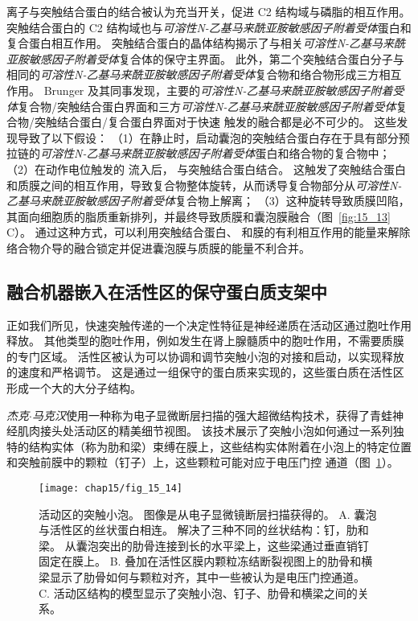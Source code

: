  离子与突触结合蛋白的结合被认为充当开关，促进 C2 结构域与磷脂的相互作用。
突触结合蛋白的 C2 结构域也与\textit{可溶性N-乙基马来酰亚胺敏感因子附着受体}蛋白和复合蛋白相互作用。
突触结合蛋白的晶体结构揭示了与相关\textit{可溶性N-乙基马来酰亚胺敏感因子附着受体}复合体的保守主界面。
此外，第二个突触结合蛋白分子与相同的\textit{可溶性N-乙基马来酰亚胺敏感因子附着受体}复合物和络合物形成三方相互作用。
Brunger 及其同事发现，主要的\textit{可溶性N-乙基马来酰亚胺敏感因子附着受体}复合物/突触结合蛋白界面和三方\textit{可溶性N-乙基马来酰亚胺敏感因子附着受体}复合物/突触结合蛋白/复合蛋白界面对于快速  触发的融合都是必不可少的。
这些发现导致了以下假设：
（1）在静止时，启动囊泡的突触结合蛋白存在于具有部分预拉链的\textit{可溶性N-乙基马来酰亚胺敏感因子附着受体}蛋白和络合物的复合物中；
（2）在动作电位触发的  流入后， 与突触结合蛋白结合。
这触发了突触结合蛋白和质膜之间的相互作用，导致复合物整体旋转，从而诱导复合物部分从\textit{可溶性N-乙基马来酰亚胺敏感因子附着受体}复合物上解离；
（3）这种旋转导致质膜凹陷，其面向细胞质的脂质重新排列，并最终导致质膜和囊泡膜融合（图~\ref{fig:15_13} C）。
通过这种方式，可以利用突触结合蛋白、 和膜的有利相互作用的能量来解除络合物介导的融合锁定并促进囊泡膜与质膜的能量不利合并。



\subsection{融合机器嵌入在活性区的保守蛋白质支架中}

正如我们所见，快速突触传递的一个决定性特征是神经递质在活动区通过胞吐作用释放。
其他类型的胞吐作用，例如发生在肾上腺髓质中的胞吐作用，不需要质膜的专门区域。
活性区被认为可以协调和调节突触小泡的对接和启动，以实现释放的速度和严格调节。
这是通过一组保守的蛋白质来实现的，这些蛋白质在活性区形成一个大的大分子结构。


\textit{杰克$\cdot$马克汉}使用一种称为电子显微断层扫描的强大超微结构技术，获得了青蛙神经肌肉接头处活动区的精美细节视图。
该技术展示了突触小泡如何通过一系列独特的结构实体（称为肋和梁）束缚在膜上，这些结构实体附着在小泡上的特定位置和突触前膜中的颗粒（钉子）上，这些颗粒可能对应于电压门控  通道（图~\ref{fig:15_14}）。


\begin{figure}[htbp]
	\centering
	\texttt{[image: chap15/fig\_15\_14]}
	\caption{活动区的突触小泡。
		图像是从电子显微镜断层扫描获得的\cite{harlow2001architecture}。
		A. 囊泡与活性区的丝状蛋白相连。
		解决了三种不同的丝状结构：钉，肋和梁。
		从囊泡突出的肋骨连接到长的水平梁上，这些梁通过垂直销钉固定在膜上。
		B. 叠加在活性区膜内颗粒冻结断裂视图上的肋骨和横梁显示了肋骨如何与颗粒对齐，其中一些被认为是电压门控通道。
		C. 活动区结构的模型显示了突触小泡、钉子、肋骨和横梁之间的关系。}
	\label{fig:15_14}
\end{figure}


